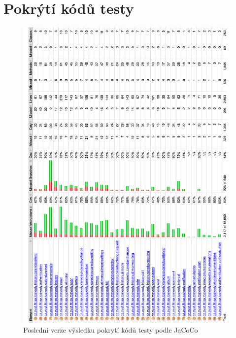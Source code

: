 \chapter{Pokrýtí kódů testy}\label{dodatek:code-coverage}
    \begin{figure}\centering
	    \includegraphics[width=1.0\textwidth]{pdfs/JaCoCo-results}
	    \caption[Pokrytí kódů testy podle JaCoCo]{Poslední verze výsledku pokrytí kódů testy podle JaCoCo}\label{image:DomainModel}
    \end{figure}
